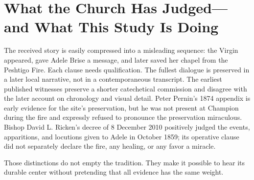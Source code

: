 \section{What the Church Has Judged---and What This Study Is Doing}


The received story is easily compressed into a misleading sequence: the Virgin appeared, gave Adele Brise a message, and later saved her chapel from the Peshtigo Fire. Each clause needs qualification. The fullest dialogue is preserved in a later local narrative, not in a contemporaneous transcript. The earliest published witnesses preserve a shorter catechetical commission and disagree with the later account on chronology and visual detail. Peter Pernin's 1874 appendix is early evidence for the site's preservation, but he was not present at Champion during the fire and expressly refused to pronounce the preservation miraculous. Bishop David L. Ricken's decree of 8 December 2010 positively judged the events, apparitions, and locutions given to Adele in October 1859; its operative clause did not separately declare the fire, any healing, or any favor a miracle.

Those distinctions do not empty the tradition. They make it possible to hear its durable center without pretending that all evidence has the same weight.

